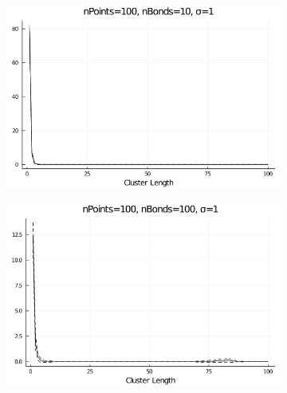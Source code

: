 \begin{figure}
\begin{subfigure}{0.32\textwidth}
		\centering
		\includegraphics[width=\textwidth]{figures/ClusterLengthDistributionWithNBonds/sigma1/clusterLengthDistribution_nPoints100 nBonds10 sigma1.png}
	\end{subfigure}
\hspace{-0.2cm}
\begin{subfigure}{0.32\textwidth}
		\centering
		\includegraphics[width=\textwidth]{figures/ClusterLengthDistributionWithNBonds/sigma1/clusterLengthDistribution_nPoints100 nBonds100 sigma1.png}
\end{subfigure} \hspace{-0.3cm}
\begin{subfigure}{0.32\textwidth}
		\centering

\end{subfigure}
\end{figure}
